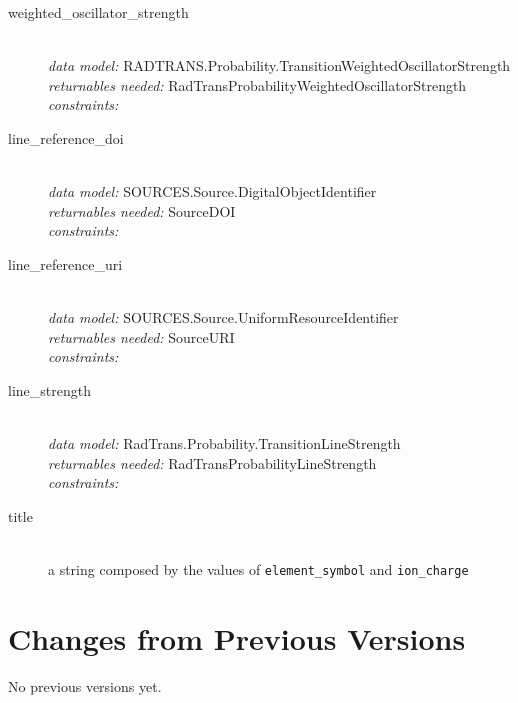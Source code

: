 \documentclass[11pt,a4paper]{ivoa}
\begin{document}
\begin{description}
\item [weighted\_oscillator\_strength]\hfill\\
	\textit{data model:}  RADTRANS.Probability.TransitionWeightedOscillatorStrength\\
	\textit{returnables needed:} RadTransProbabilityWeightedOscillatorStrength\\
    \textit{constraints:}

\item [line\_reference\_doi]\hfill\\
	\textit{data model:} SOURCES.Source.DigitalObjectIdentifier\\
	\textit{returnables needed:} SourceDOI\\
	\textit{constraints:}

\item [line\_reference\_uri]\hfill\\
	\textit{data model:} SOURCES.Source.UniformResourceIdentifier\\
	\textit{returnables needed:} SourceURI\\
	\textit{constraints:}

\item [line\_strength]\hfill\\
	\textit{data model:} RadTrans.Probability.TransitionLineStrength\\
	\textit{returnables needed:} RadTransProbabilityLineStrength\\
    \textit{constraints:}

\item [title]\hfill\\
	a string composed by the values of  \texttt{element\_symbol} and \texttt{ion\_charge}


\end{description}


\appendix
\section{Changes from Previous Versions}

No previous versions yet.



\end{document}
